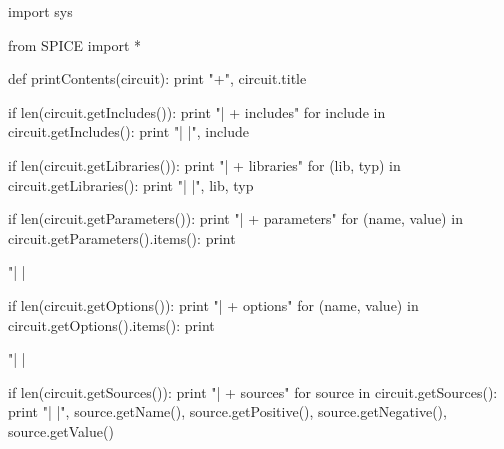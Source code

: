\begin{DoxyCodeInclude}
\textcolor{keyword}{import} sys

\textcolor{keyword}{from} SPICE \textcolor{keyword}{import} *

\textcolor{keyword}{def }printContents(circuit):
  \textcolor{keywordflow}{print} \textcolor{stringliteral}{"+"}, circuit.title

  \textcolor{keywordflow}{if} len(circuit.getIncludes()):
    \textcolor{keywordflow}{print} \textcolor{stringliteral}{"| + includes"}
    \textcolor{keywordflow}{for} include \textcolor{keywordflow}{in} circuit.getIncludes():
      \textcolor{keywordflow}{print} \textcolor{stringliteral}{"| |"}, include

  \textcolor{keywordflow}{if} len(circuit.getLibraries()):
    \textcolor{keywordflow}{print} \textcolor{stringliteral}{"| + libraries"}
    \textcolor{keywordflow}{for} (lib, typ) \textcolor{keywordflow}{in} circuit.getLibraries():
      \textcolor{keywordflow}{print} \textcolor{stringliteral}{"| |"}, lib, typ

  \textcolor{keywordflow}{if} len(circuit.getParameters()):
    \textcolor{keywordflow}{print} \textcolor{stringliteral}{"| + parameters"}
    \textcolor{keywordflow}{for} (name, value) \textcolor{keywordflow}{in} circuit.getParameters().items():
      \textcolor{keywordflow}{print} \textcolor{stringliteral}{"| | %

  \textcolor{keywordflow}{if} len(circuit.getOptions()):
    \textcolor{keywordflow}{print} \textcolor{stringliteral}{"| + options"}
    \textcolor{keywordflow}{for} (name, value) \textcolor{keywordflow}{in} circuit.getOptions().items():
      \textcolor{keywordflow}{print} \textcolor{stringliteral}{"| | %

  \textcolor{keywordflow}{if} len(circuit.getSources()):
    \textcolor{keywordflow}{print} \textcolor{stringliteral}{"| + sources"}
    \textcolor{keywordflow}{for} source \textcolor{keywordflow}{in} circuit.getSources():
      \textcolor{keywordflow}{print} \textcolor{stringliteral}{"| |"}, source.getName(), source.getPositive(), source.getNegative(), source.getValue()

}}
\end{DoxyCodeInclude}
